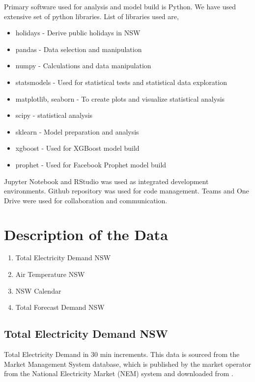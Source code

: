 \documentclass[mstat,12pt]{unswthesis}
\begin{document}
Primary software used for analysis and model build is Python. We have
used extensive set of python libraries. List of libraries used are,

\begin{itemize}
  \item holidays - Derive public holidays in NSW 
  \item pandas - Data selection and manipulation
  \item numpy - Calculations and data manipulation
  \item statsmodels - Used for statistical tests and statistical data exploration
  \item matplotlib, seaborn - To create plots and visualize statistical analysis
  \item scipy - statistical analysis
  \item sklearn - Model preparation and analysis
  \item xgboost - Used for XGBoost model build
  \item prophet - Used for Facebook Prophet model build
\end{itemize}

Jupyter Notebook and RStudio was used as integrated development
environments. Github repository was used for code management. Teams and
One Drive were used for collaboration and communication.

\section{Description of the Data}\label{description-of-the-data}

\begin{enumerate}
    \item Total Electricity Demand NSW
    \item Air Temperature NSW
    \item NSW Calendar
    \item Total Forecast Demand NSW
\end{enumerate}

\subsection{Total Electricity Demand
NSW}\label{total-electricity-demand-nsw}

Total Electricity Demand in 30 min increments. This data is sourced from
the Market Management System database, which is published by the market
operator from the National Electricity Market (NEM) system and
downloaded from \cite{UNSW_project}.
\end{document}
